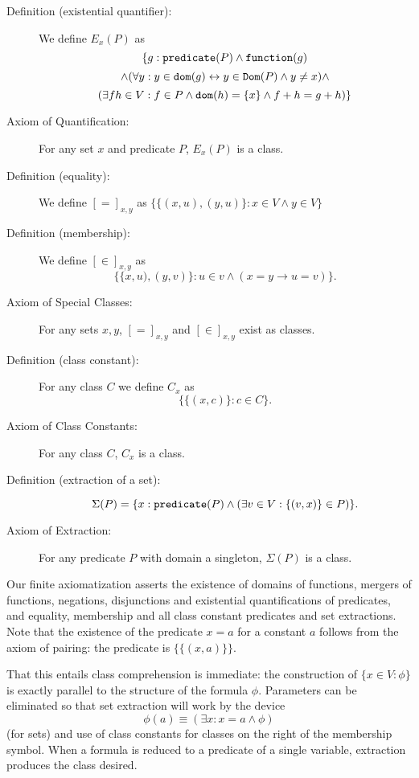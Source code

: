 \documentclass[12pt]{article}
\begin{document}
\begin{description}
\item[Definition (existential quantifier):]  We define $E_x(P)$ as $$\{g:{\tt predicate}(P) \wedge {\tt function}(g) $$ $$ \wedge (\forall y:y \in {\tt dom}(g) \leftrightarrow y \in {\tt Dom}(P) \wedge y \neq x) \wedge$$ $$ (\exists fh\in V:f \in P \wedge {\tt dom}(h) = \{x\} \wedge f+h = g+h)\}$$

\item[Axiom of Quantification:]  For any set $x$ and predicate $P$, $E_x(P)$ is a class.

\item[Definition (equality):] We define $[=]_{x,y}$ as $\{\{(x,u),(y,u)\}:x \in V \wedge y \in V\}$

\item[Definition (membership):]  We define $[\in]_{x,y}$ as $$\{\{x,u),(y,v)\}:u \in v \wedge (x=y \rightarrow u=v)\}.$$

\item[Axiom of Special Classes:]  For any sets $x,y$, $[=]_{x,y}$  and $[\in]_{x,y}$ exist as classes.

\item[Definition (class constant):]  For any class $C$ we define $C_x$ as $$\{\{(x,c)\}:c \in C\}.$$

\item[Axiom of Class Constants:]  For any class $C$, $C_x$ is a class.

\item[Definition (extraction of a set):]  $$\Sigma(P) = \{x:{\tt predicate}(P) \wedge (\exists v\in V:\{(v,x)\} \in P)\}.$$

\item[Axiom of Extraction:]  For any predicate $P$ with domain a singleton, $\Sigma(P)$ is a class.

\end{description}

Our finite axiomatization asserts the existence of domains of functions, mergers of functions, negations, disjunctions and existential quantifications of predicates, and equality, membership and all class constant predicates and set extractions.  Note that the existence of the predicate $x=a$ for a constant $a$ follows from the axiom of pairing:  the predicate is $\{\{(x,a)\}\}$.   

That this entails class comprehension is immediate:  the construction of $\{x \in V:\phi\}$ is exactly parallel to the structure of the formula $\phi$.
Parameters can be eliminated so that set extraction will work by the device $$\phi(a) \equiv (\exists x:x=a \wedge \phi)$$ (for sets) and use of
class constants for classes on the right of the membership symbol.  When a formula is reduced to a predicate of a single variable, extraction produces the class desired.
\end{document}
